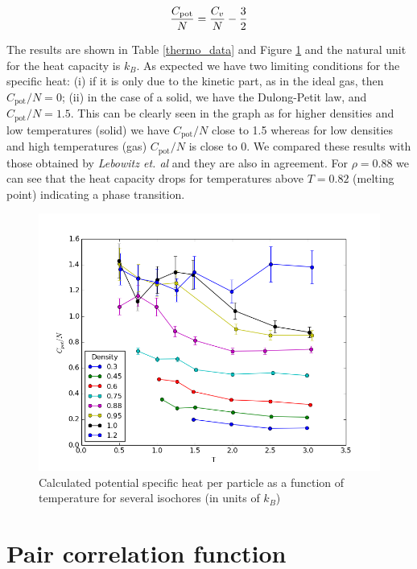 \documentclass[aps,prl,reprint,groupedaddress]{revtex4-1}
\begin{document}
\begin{equation}
  \frac{C_{\textup{pot}}}{N} = \frac{C_v}{N} - \frac{3}{2}
\end{equation}

The results are shown in Table \ref{thermo_data} and Figure \ref{heat_cap_graph} and the natural unit for the heat capacity is $k_B$. As expected we have two limiting conditions for the specific heat: (i) if it is only due to the kinetic part, as in the ideal gas, then $C_{\text{pot}}/N = 0$; (ii) in the case of a solid, we have the Dulong-Petit law, and $C_{\text{pot}}/N = 1.5$. This can be clearly seen in the graph as for higher densities and low temperatures (solid) we have $C_{\text{pot}}/N$ close to 1.5 whereas for low densities and high temperatures (gas) $C_{\text{pot}}/N$ is close to 0. We compared these results with those obtained by \textit{Lebowitz et. al} \cite{Lebowitz1967} and they are also in agreement. For $\rho=0.88$ we can see that the heat capacity drops for temperatures above $T=0.82$ (melting point) indicating a phase transition.

\begin{figure}[ht]
	\includegraphics[scale=0.4]{heat_cap.png}
	\caption{Calculated potential specific heat per particle as a function of temperature for  several isochores (in units of $k_B$)\label{heat_cap_graph}}
\end{figure}

\section{Pair correlation function \label{correlation}}
\end{document}
